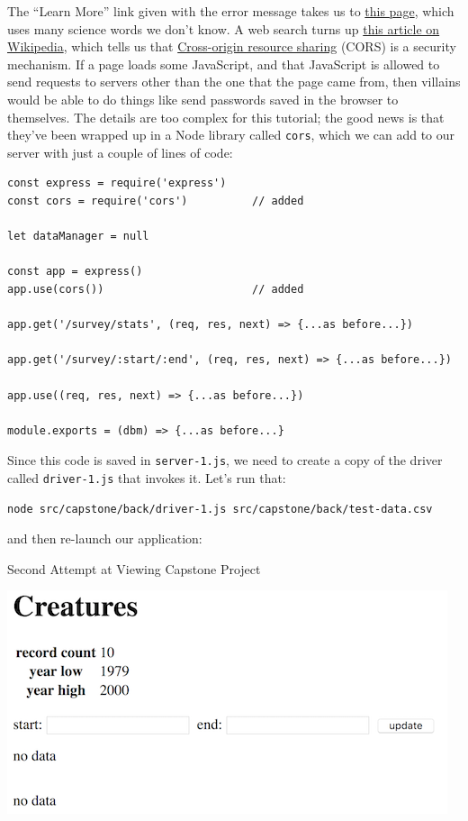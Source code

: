 The ``Learn More'' link given with the error message takes us to
\href{https://developer.mozilla.org/en-US/docs/Web/HTTP/CORS/Errors/CORSMissingAllowOrigin}{this
page}, which uses many science words we don't know. A web search turns
up
\href{https://en.wikipedia.org/wiki/Cross-origin_resource_sharing}{this
article on Wikipedia}, which tells us that
\protect\hyperlink{g:cors}{Cross-origin resource sharing} (CORS) is a
security mechanism. If a page loads some JavaScript, and that JavaScript
is allowed to send requests to servers other than the one that the page
came from, then villains would be able to do things like send passwords
saved in the browser to themselves. The details are too complex for this
tutorial; the good news is that they've been wrapped up in a Node
library called \texttt{cors}, which we can add to our server with just a
couple of lines of code:

\begin{verbatim}
const express = require('express')
const cors = require('cors')          // added

let dataManager = null

const app = express()
app.use(cors())                       // added

app.get('/survey/stats', (req, res, next) => {...as before...})

app.get('/survey/:start/:end', (req, res, next) => {...as before...})

app.use((req, res, next) => {...as before...})

module.exports = (dbm) => {...as before...}
\end{verbatim}

Since this code is saved in \texttt{server-1.js}, we need to create a
copy of the driver called \texttt{driver-1.js} that invokes it. Let's
run that:

\begin{verbatim}
node src/capstone/back/driver-1.js src/capstone/back/test-data.csv
\end{verbatim}

and then re-launch our application:

Second Attempt at Viewing Capstone Project

\includegraphics{../../files/capstone-second-attempt.png}

